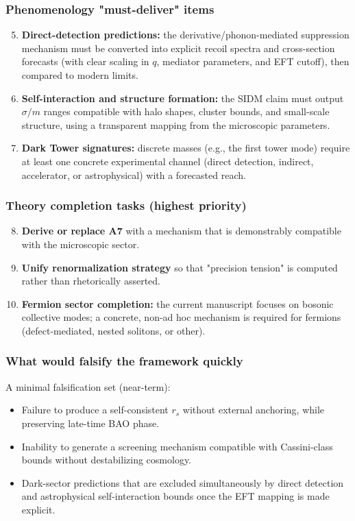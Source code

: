 \documentclass[a4paper,12pt]{article}
\begin{document}
\subsubsection{Phenomenology "must-deliver" items}
\begin{enumerate}
    \setcounter{enumi}{4}
    \item \textbf{Direct-detection predictions:} the derivative/phonon-mediated suppression mechanism must be converted into explicit recoil spectra and cross-section forecasts (with clear scaling in $q$, mediator parameters, and EFT cutoff), then compared to modern limits.
    \item \textbf{Self-interaction and structure formation:} the SIDM claim must output $\sigma/m$ ranges compatible with halo shapes, cluster bounds, and small-scale structure, using a transparent mapping from the microscopic parameters.
    \item \textbf{Dark Tower signatures:} discrete masses (e.g., the first tower mode) require at least one concrete experimental channel (direct detection, indirect, accelerator, or astrophysical) with a forecasted reach.
\end{enumerate}

\subsubsection{Theory completion tasks (highest priority)}
\begin{enumerate}
    \setcounter{enumi}{7}
    \item \textbf{Derive or replace A7} with a mechanism that is demonstrably compatible with the microscopic sector.
    \item \textbf{Unify renormalization strategy} so that "precision tension" is computed rather than rhetorically asserted.
    \item \textbf{Fermion sector completion:} the current manuscript focuses on bosonic collective modes; a concrete, non-ad hoc mechanism is required for fermions (defect-mediated, nested solitons, or other).
\end{enumerate}

\subsubsection{What would falsify the framework quickly}
A minimal falsification set (near-term):
\begin{itemize}
    \item Failure to produce a self-consistent $r_s$ without external anchoring, while preserving late-time BAO phase.
    \item Inability to generate a screening mechanism compatible with Cassini-class bounds without destabilizing cosmology.
    \item Dark-sector predictions that are excluded simultaneously by direct detection and astrophysical self-interaction bounds once the EFT mapping is made explicit.
\end{itemize}
\end{document}
